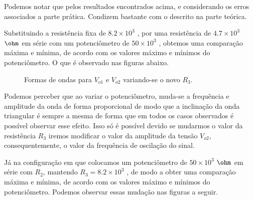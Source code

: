 Podemos notar que pelos resultados encontrados acima, e considerando os erros associados a parte prática. Condizem bastante com o descrito na parte teórica.

Substituindo a resistência fixa de $8.2 \times10^3$ \ohm, por uma resistência de $4.7 \times10^3 $ $\ohm$ em série com um potenciômetro de $50 \times10^3 $ \ohm, obtemos uma comparação máxima e mínima, de acordo com os valores máximo e mínimos do potenciômetro. O que é observado nas figuras abaixo.

\begin{figure}[H] 
\centering
{}
\caption{Formas de ondas para $V_{o1}$ e $V_{o2}$ variando-se o novo $R_3$.}
\label{cut}
\end{figure}

Podemos perceber que ao variar o potenciômetro, muda-se a frequência e amplitude da onda de forma proporcional de modo que a inclinação da onda triangular é sempre a mesma de forma que em todos os casos observados é possível observar esse efeito. Isso só é possível devido se mudarmos o valor da resistência $R_3$ iremos modificar o valor da amplitude da tensão $V_{o2}$, consequentemente, o valor da frequência de oscilação do sinal.

Já na configuração em que colocamos um potenciômetro de $50 \times10^3 $ $\ohm$ em série com $R_2$, mantendo $R_3 = 8.2 \times10^3$ \ohm, de modo a obter uma comparação máxima e mínima, de acordo com os valores máximo e mínimos do potenciômetro. Podemos observar essas mudação nas figuras a seguir.

